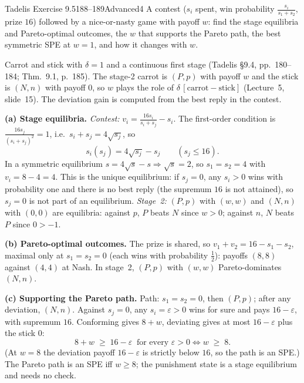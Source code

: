\begin{exsol}{Tadelis Exercise 9.5}{188--189}{Advanced}{4}
\asked A contest ($s_i$ spent, win probability $\frac{s_i}{s_1+s_2}$, prize $16$) followed by a nice-or-nasty
game with payoff $w$: find the stage equilibria and Pareto-optimal outcomes, the $w$ that supports the Pareto
path, the best symmetric SPE at $w=1$, and how it changes with $w$.

\method Carrot and stick with $\delta = 1$ and a continuous first stage (Tadelis \S9.4, pp.~180--184;
Thm.~9.1, p.~185). The stage-2 carrot is $(P,p)$ with payoff $w$ and the stick is $(N,n)$ with payoff $0$, so $w$
plays the role of $\delta\,[\text{carrot} - \text{stick}]$ (Lecture~5, slide~15). The deviation gain is computed
from the best reply in the contest.

\solution
\textbf{(a) Stage equilibria.} \emph{Contest:} $v_i = \frac{16s_i}{s_i + s_j} - s_i$. The first-order condition
is $\frac{16s_j}{(s_i + s_j)^2} = 1$, i.e.\ $s_i + s_j = 4\sqrt{s_j}$, so
\[
  s_i(s_j) = 4\sqrt{s_j} - s_j \qquad (s_j \le 16).
\]
In a symmetric equilibrium $s = 4\sqrt s - s \Rightarrow \sqrt s = 2$, so $s_1 = s_2 = 4$ with $v_i = 8 - 4 = 4$. This is the unique
equilibrium: if $s_j = 0$, any $s_i > 0$ wins with probability one and there is no best reply (the supremum $16$
is not attained), so $s_j = 0$ is not part of an equilibrium. \emph{Stage~2:} $(P,p)$ with $(w,w)$ and $(N,n)$ with $(0,0)$ are
equilibria: against $p$, $P$ beats $N$ since $w > 0$; against $n$, $N$ beats $P$ since $0 > -1$.

\textbf{(b) Pareto-optimal outcomes.} The prize is shared, so $v_1 + v_2 = 16 - s_1 - s_2$, maximal only at
$s_1 = s_2 = 0$ (each wins with probability $\frac12$): payoffs $(8,8)$ against $(4,4)$ at Nash.
In stage~2, $(P,p)$ with $(w,w)$ Pareto-dominates $(N,n)$.

\textbf{(c) Supporting the Pareto path.} Path: $s_1 = s_2 = 0$, then $(P,p)$; after any deviation, $(N,n)$.
Against $s_j = 0$, any $s_i = \varepsilon > 0$ wins for sure and pays $16 - \varepsilon$, with supremum $16$.
Conforming gives $8 + w$, deviating gives at most $16 - \varepsilon$ plus the stick $0$:
\[
  8 + w \;\ge\; 16 - \varepsilon \ \text{ for every } \varepsilon > 0 \iff w \;\ge\; 8 .
\]
(At $w = 8$ the deviation payoff $16 - \varepsilon$ is strictly below $16$, so the path is an SPE.) The Pareto path is an
SPE iff $w \ge 8$; the punishment state is a stage equilibrium and needs no check.


\end{exsol}

